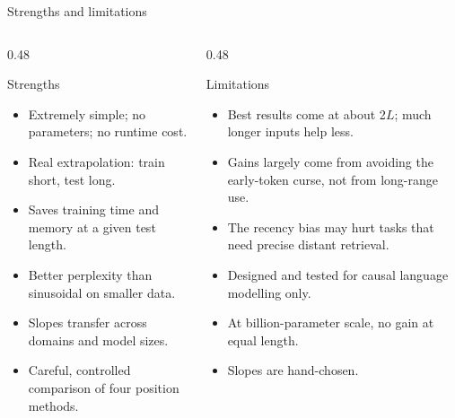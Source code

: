 \documentclass[aspectratio=169,11pt]{beamer}
\begin{document}
\begin{frame}{Strengths and limitations}
  \begin{columns}[T]
    \begin{column}{0.48\textwidth}
      \begin{exampleblock}{Strengths}
        \small
        \begin{itemize}
          \item Extremely simple; no parameters; no runtime cost.
          \item Real extrapolation: train short, test long.
          \item Saves training time and memory at a given test length.
          \item Better perplexity than sinusoidal on smaller data.
          \item Slopes transfer across domains and model sizes.
          \item Careful, controlled comparison of four position methods.
        \end{itemize}
      \end{exampleblock}
    \end{column}
    \begin{column}{0.48\textwidth}
      \begin{alertblock}{Limitations}
        \small
        \begin{itemize}
          \item Best results come at about 2$L$; much longer inputs help less.
          \item Gains largely come from avoiding the early-token curse, not from long-range use.
          \item The recency bias may hurt tasks that need precise distant retrieval.
          \item Designed and tested for causal language modelling only.
          \item At billion-parameter scale, no gain at equal length.
          \item Slopes are hand-chosen.
        \end{itemize}
      \end{alertblock}
    \end{column}
  \end{columns}
\end{frame}
\end{document}
